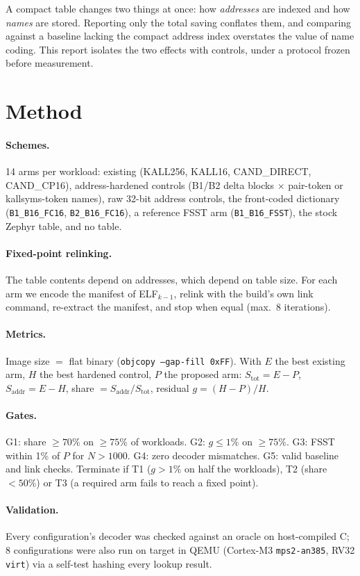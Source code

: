 \documentclass[10pt,twocolumn]{article}
\begin{document}
A compact table changes two things at once: how \emph{addresses} are indexed and how \emph{names} are stored. Reporting only the total saving conflates them, and comparing against a baseline lacking the compact address index overstates the value of name coding. This report isolates the two effects with controls, under a protocol frozen before measurement.

\section{Method}
\paragraph{Schemes.} 14 arms per workload: existing (KALL256, KALL16, CAND\_DIRECT, CAND\_CP16), address-hardened controls (B1/B2 delta blocks $\times$ pair-token or kallsyms-token names), raw 32-bit address controls, the front-coded dictionary (\texttt{B1\_B16\_FC16}, \texttt{B2\_B16\_FC16}), a reference FSST arm (\texttt{B1\_B16\_FSST}), the stock Zephyr table, and no table.
\paragraph{Fixed-point relinking.} The table contents depend on addresses, which depend on table size. For each arm we encode the manifest of ELF$_{k-1}$, relink with the build's own link command, re-extract the manifest, and stop when equal (max.\ 8 iterations).
\paragraph{Metrics.} Image size $=$ flat binary (\texttt{objcopy --gap-fill 0xFF}). With $E$ the best existing arm, $H$ the best hardened control, $P$ the proposed arm: $S_\mathrm{tot}=E-P$, $S_\mathrm{addr}=E-H$, share $=S_\mathrm{addr}/S_\mathrm{tot}$, residual $g=(H-P)/H$.
\paragraph{Gates.} G1: share $\ge70\%$ on $\ge75\%$ of workloads. G2: $g\le1\%$ on $\ge75\%$. G3: FSST within 1\% of $P$ for $N>1000$. G4: zero decoder mismatches. G5: valid baseline and link checks. Terminate if T1 ($g>1\%$ on half the workloads), T2 (share $<50\%$) or T3 (a required arm fails to reach a fixed point).
\paragraph{Validation.} Every configuration's decoder was checked against an oracle on host-compiled C; 8 configurations were also run on target in QEMU (Cortex-M3 \texttt{mps2-an385}, RV32 \texttt{virt}) via a self-test hashing every lookup result.
\end{document}
